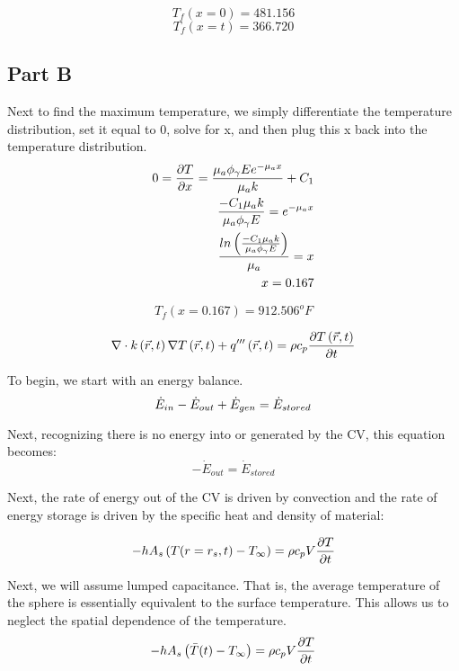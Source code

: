 \documentclass{article}
\begin{document}
\[
\boxed{T_f(x = 0) = 481.156} \]\[
\boxed{T_f(x = t) = 366.720}
\]

\subsection{Part B}
Next to find the maximum temperature, we simply differentiate the temperature distribution, set it equal to 0, solve for x, and then plug this x back into the temperature distribution. 
\begin{align}    
    0 = \frac{\partial T}{\partial x} = \frac{\mu_a \phi_{\gamma} E e^{-\mu_a x}}{\mu_ak}+C_1 \\
    \frac{-C_1 \mu_a k}{\mu_a \phi_{\gamma} E} = e^{-\mu_a x} \\
    \frac{ln\left(\frac{-C_1 \mu_a k}{\mu_a \phi_{\gamma} E}\right)}{\mu_a} = x \\
    x = 0.167
\end{align}

\[
\boxed{T_f(x = 0.167) = 912.506 ^oF}
\]

\newpage
{}
\begin{equation}
    \nabla \cdot k\left(\Vec{r},t\right) \nabla T \left(\Vec{r},t\right) + q'''\left(\Vec{r},t\right) = \rho c_p \frac{\partial T \left(\Vec{r},t\right)}{\partial t}
\end{equation}










\newpage
{}
To begin, we start with an energy balance. 
\begin{equation}
    \Dot{E}_{in} - \Dot{E}_{out} + \Dot{E}_{gen} = \Dot{E}_{stored}
\end{equation}

Next, recognizing there is no energy into or generated by the CV, this equation becomes:
\begin{equation}
    -\Dot{E}_{out} = \Dot{E}_{stored}
\end{equation}

Next, the rate of energy out of the CV is driven by convection and the rate of energy storage is driven by the specific heat and density of material:

\begin{equation}
    -h A_s \left(T(r=r_s,t) - T_{\infty}\right) = \rho c_p V \frac{\partial T}{\partial t}
\end{equation}

Next, we will assume lumped capacitance. That is, the average temperature of the sphere is essentially equivalent to the surface temperature. This allows us to neglect the spatial dependence of the temperature. 
\begin{equation}
    -h A_s \left(\Bar{T}(t) - T_{\infty}\right) = \rho c_p V \frac{\partial T}{\partial t}
\end{equation}
\end{document}
